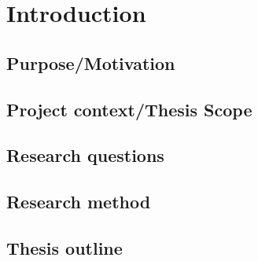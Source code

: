 
\chapter{Introduction} %

\label{Chapter1} %


\section{Purpose/Motivation}

\section{Project context/Thesis Scope}

\section{Research questions}

\section{Research method}

\section{Thesis outline}